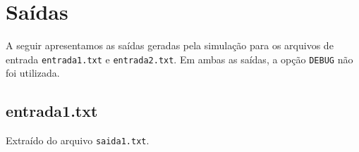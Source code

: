 \documentclass[12pt]{article}
\begin{document}

\section{Saídas}

A seguir apresentamos as saídas geradas pela simulação para os arquivos de entrada 
\verb|entrada1.txt| e \verb|entrada2.txt|. Em ambas as saídas, a opção \verb|DEBUG| não foi 
utilizada.

\subsection*{entrada1.txt}

Extraído do arquivo \verb|saida1.txt|.
\end{document}
